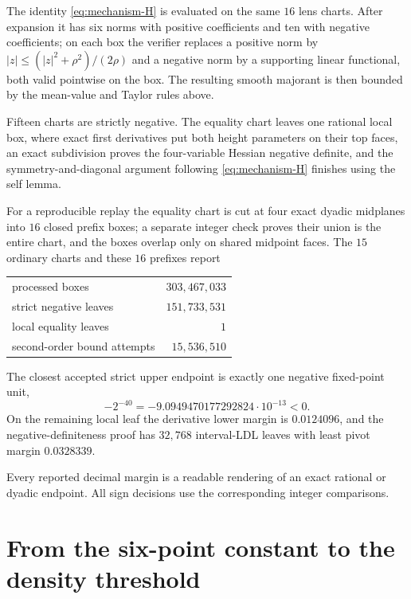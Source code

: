 \documentclass[11pt]{article}
\theoremstyle{plain}
\theoremstyle{definition}
\theoremstyle{remark}
\begin{document}
The identity \eqref{eq:mechanism-H} is evaluated on the same $16$ lens
charts.  After expansion it has six norms with positive coefficients and
ten with negative coefficients; on each box the verifier replaces a
positive norm by $|z|\le(|z|^2+\rho^2)/(2\rho)$ and a negative norm by a
supporting linear functional, both valid pointwise on the box.  The
resulting smooth majorant is then bounded by the mean-value and Taylor
rules above.

Fifteen charts are strictly negative.  The equality chart leaves one
rational local box, where exact first derivatives put both height
parameters on their top faces, an exact subdivision proves the
four-variable Hessian negative definite, and the symmetry-and-diagonal
argument following \eqref{eq:mechanism-H} finishes using the self lemma.

For a reproducible replay the equality chart is cut at four exact dyadic
midplanes into $16$ closed prefix boxes; a separate integer check proves
their union is the entire chart, and the boxes overlap only on shared
midpoint faces.  The $15$ ordinary charts and these $16$ prefixes report

\begin{center}
\begin{tabular}{@{}lr@{}}
\toprule
processed boxes&$303{,}467{,}033$\\
strict negative leaves&$151{,}733{,}531$\\
local equality leaves&$1$\\
second-order bound attempts&$15{,}536{,}510$\\
\bottomrule
\end{tabular}
\end{center}

\noindent
The closest accepted strict upper endpoint is exactly one negative
fixed-point unit,
\[
 -2^{-40}=-9.0949470177292824\cdot10^{-13}<0 .
\]
On the remaining local leaf the derivative lower margin is $0.0124096$, and
the negative-definiteness proof has $32{,}768$ interval-LDL leaves with
least pivot margin $0.0328339$.

Every reported decimal margin is a readable rendering of an exact rational
or dyadic endpoint.  All sign decisions use the corresponding integer
comparisons.

\section{From the six-point constant to the density threshold}
\label{sec:transfer}
\end{document}
